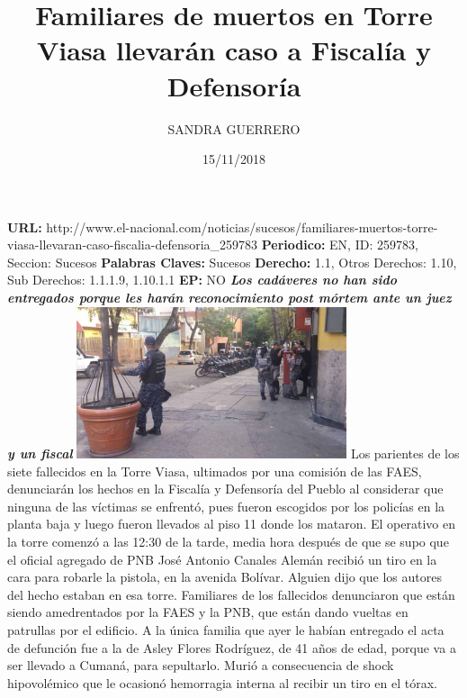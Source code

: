 \documentclass{article}%
\title{\textbf{Familiares de muertos en Torre Viasa llevarán caso a Fiscalía y Defensoría}}%
\author{SANDRA GUERRERO}%
\date{15/11/2018}%
\begin{document}
%
\normalsize%
\maketitle%
\textbf{URL: }%
http://www.el{-}nacional.com/noticias/sucesos/familiares{-}muertos{-}torre{-}viasa{-}llevaran{-}caso{-}fiscalia{-}defensoria\_259783\newline%
%
\textbf{Periodico: }%
EN, %
ID: %
259783, %
Seccion: %
Sucesos\newline%
%
\textbf{Palabras Claves: }%
Sucesos\newline%
%
\textbf{Derecho: }%
1.1, %
Otros Derechos: %
1.10, %
Sub Derechos: %
1.1.1.9, 1.10.1.1\newline%
%
\textbf{EP: }%
NO\newline%
\newline%
%
\textbf{\textit{Los cadáveres no han sido entregados porque les harán reconocimiento post mórtem ante un juez y un fiscal}}%
\newline%
\newline%
%
\includegraphics[width=300px]{204.jpg}%
\newline%
%
Los parientes de los siete fallecidos en la Torre Viasa, ultimados por una comisión de las FAES, denunciarán los hechos en la Fiscalía y Defensoría del Pueblo al considerar que ninguna de las víctimas se enfrentó, pues fueron escogidos por los policías en la planta baja y luego fueron llevados al piso 11 donde los mataron.%
\newline%
%
El operativo en la torre comenzó a las 12:30 de la tarde, media hora después de que se supo que el oficial agregado de PNB José Antonio Canales Alemán recibió un tiro en la cara para robarle la pistola, en la avenida Bolívar. Alguien dijo que los autores del hecho estaban en esa torre.%
\newline%
%
Familiares de los fallecidos denunciaron que están siendo amedrentados por la FAES y la PNB, que están dando vueltas en patrullas por el edificio.%
\newline%
%
A la única familia que ayer le habían entregado el acta de defunción fue a la de Asley Flores Rodríguez, de 41 años de edad, porque va a ser llevado a Cumaná, para sepultarlo. Murió a consecuencia de shock hipovolémico que le ocasionó hemorragia interna al recibir un tiro en el tórax.%
\end{document}
